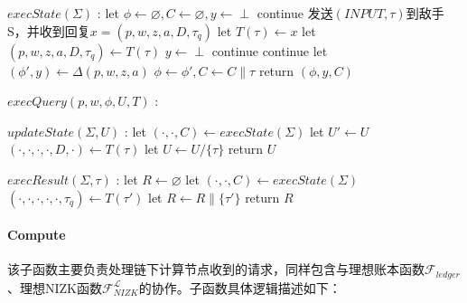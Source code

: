 \begin{breakablealgorithm}
\begin{algorithmic}
        \noindent\hrulefill
        \item[$execState(\Sigma)$]:
        \STATE let $\phi \leftarrow \varnothing, C \leftarrow \varnothing, y \leftarrow \perp$
        \FOR {$\tau \in \Sigma$}
        \STATE continue
        \ENDIF
        \STATE 发送$(INPUT, \tau)$到敌手S，并收到回复$x = (p, w, z, a, D, \tau_q)$
        \STATE let $T(\tau) \leftarrow x$
        \ENDIF
        \STATE let $(p, w, z, a, D, \tau_q) \leftarrow T(\tau)$
        \STATE $y \leftarrow \perp$
        \STATE continue
        \ENDIF
        \STATE continue
        \ENDIF
        \STATE let $(\phi', y) \leftarrow \Delta(p, w, z, a)$
        \STATE $\phi \leftarrow \phi', C \leftarrow C \parallel \tau$
        \ENDIF
        \ENDFOR
        \STATE return $(\phi, y, C)$

        \item[$execQuery(p, w, \phi, U, T)$]:
        \STATE 

        \item[$updateState(\Sigma, U)$]:
        \STATE let $(\cdot, \cdot, C) \leftarrow execState(\Sigma)$
        \REPEAT
        \STATE let $U' \leftarrow U$
        \STATE $(\cdot, \cdot, \cdot, \cdot, D, \cdot) \leftarrow T(\tau)$
        \STATE let $U \leftarrow U / \{\tau\}$
        \ENDIF
        \ENDFOR
        \STATE return $U$

        \item[$execResult(\Sigma, \tau)$]: 
        \STATE let $R \leftarrow \varnothing$
        \STATE let $(\cdot, \cdot, C) \leftarrow execState(\Sigma)$
        \STATE $(\cdot, \cdot, \cdot, \cdot, \cdot, \tau_q) \leftarrow T(\tau')$
        \STATE let $R \leftarrow R \parallel \{\tau'\}$
        \ENDIF
        \ENDFOR
        \STATE return $R$
        
    \end{algorithmic}
\end{breakablealgorithm}

\paragraph{Compute} 该子函数主要负责处理链下计算节点收到的请求，同样包含与理想账本函数$\mathcal{F}_{ledger}$、理想NIZK函数$\mathcal{F}_{NIZK}^\mathcal{L}$的协作。子函数具体逻辑描述如下：

